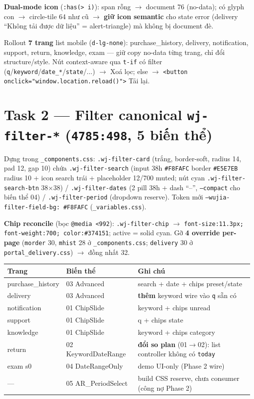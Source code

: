 \textbf{Dual-mode icon} (\texttt{:has(> i)}): span rỗng $\rightarrow$ document 76 (no-data); có glyph con $\rightarrow$ circle-tile 64 như cũ $\rightarrow$ \textbf{giữ icon semantic} cho state error (delivery ``Không tải được dữ liệu'' = alert-triangle) mà không bị document đè.

Rollout \textbf{7 trang} list mobile (\texttt{d-lg-none}): purchase\_history, delivery, notification, support, return, knowledge, exam --- giữ copy no-data từng trang, chỉ đổi structure/style. Nút context-aware qua \texttt{t-if} có filter (\texttt{q}/\texttt{keyword}/\texttt{date\_*}/\texttt{state}/...) $\rightarrow$ Xoá lọc; else $\rightarrow$ \texttt{<button onclick="window.location.reload()">} Tải lại.

\section{Task 2 --- Filter canonical \texttt{wj-filter-*} (\texttt{4785:498}, 5 biến thể)}

Dựng trong \texttt{\_components.css}: \texttt{.wj-filter-card} (trắng, border-soft, radius 14, pad 12, gap 10) chứa \texttt{.wj-filter-search} (input 38h \texttt{\#F8FAFC} border \texttt{\#E5E7EB} radius 10 + icon search trái + placeholder 12/700 muted; nút cyan \texttt{.wj-filter-search-btn} 38$\times$38) / \texttt{.wj-filter-dates} (2 pill 38h + dash ``--'', \texttt{--compact} cho biến thể 04) / \texttt{.wj-filter-period} (dropdown reserve). Token mới \texttt{--wujia-filter-field-bg: \#F8FAFC} (\texttt{\_variables.css}).

\textbf{Chip reconcile} (bọc \texttt{@media <992}): \texttt{.wj-filter-chip} $\rightarrow$ \texttt{font-size:11.3px; font-weight:700; color:\#374151}; active = solid cyan. Gỡ \textbf{4 override per-page} (\texttt{morder} 30, \texttt{mhist} 28 ở \texttt{\_components.css}; \texttt{delivery} 30 ở \texttt{portal\_delivery.css}) $\rightarrow$ đồng nhất 32.

\begin{center}\begin{tabular}{@{}lll@{}}
\textbf{Trang} & \textbf{Biến thể} & \textbf{Ghi chú} \\
\hline
purchase\_history & 03 Advanced & search + date + chips preset/state \\
delivery & 03 Advanced & \textbf{thêm} keyword wire vào \texttt{q} sẵn có \\
notification & 01 ChipSlide & keyword + chips unread \\
support & 01 ChipSlide & q + chips state \\
knowledge & 01 ChipSlide & keyword + chips category \\
return & 02 KeywordDateRange & \textbf{đổi so plan} (01$\rightarrow$02): list controller không có \texttt{today} \\
exam s0 & 04 DateRangeOnly & demo UI-only (Phase 2 wire) \\
--- & 05 AR\_PeriodSelect & build CSS reserve, chưa consumer (công nợ Phase 2) \\
\end{tabular}\end{center}

